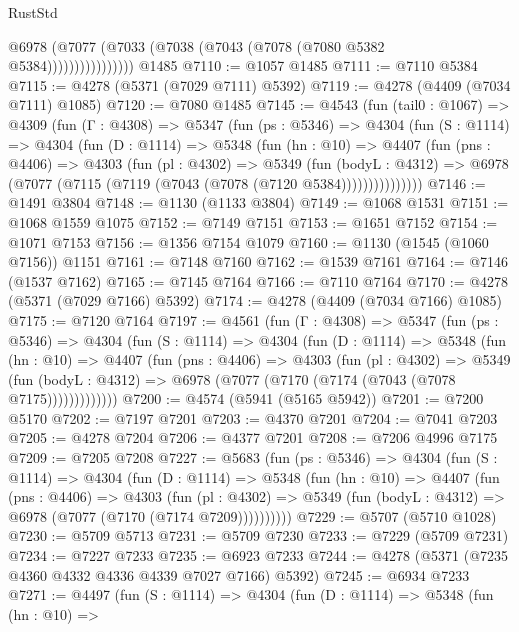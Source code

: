 \begin{lexlean}{RustStd}
\begin{coremodule}
{\begin{coremodule}
{{{{{{{{{{{{{{{{{{{{{{{{{{{{{{{{{{{                      @6978 (@7077 (@7033 (@7038 (@7043 (@7078 (@7080 @5382 @5384))))))))))))))))
    @1485
@7110 := @1057 @1485
@7111 := @7110 @5384
@7115 := @4278 (@5371 (@7029 @7111) @5392)
@7119 := @4278 (@4409 (@7034 @7111) @1085)
@7120 := @7080 @1485
@7145 := @4543
    (fun (tail0 : @1067) =>
    @4309
      (fun (Γ : @4308) =>
      @5347
        (fun (ps : @5346) =>
        @4304
          (fun (S : @1114) =>
          @4304
            (fun (D : @1114) =>
            @5348
              (fun (hn : @10) =>
              @4407
                (fun (pns : @4406) =>
                @4303
                  (fun (pl : @4302) =>
                  @5349
                    (fun (bodyL : @4312) =>
                    @6978 (@7077 (@7115 (@7119 (@7043 (@7078 (@7120 @5384)))))))))))))))
@7146 := @1491 @3804
@7148 := @1130 (@1133 @3804)
@7149 := @1068 @1531
@7151 := @1068 @1559 @1075
@7152 := @7149 @7151
@7153 := @1651 @7152
@7154 := @1071 @7153
@7156 := @1356 @7154 @1079
@7160 := @1130 (@1545 (@1060 @7156)) @1151
@7161 := @7148 @7160
@7162 := @1539 @7161
@7164 := @7146 (@1537 @7162)
@7165 := @7145 @7164
@7166 := @7110 @7164
@7170 := @4278 (@5371 (@7029 @7166) @5392)
@7174 := @4278 (@4409 (@7034 @7166) @1085)
@7175 := @7120 @7164
@7197 := @4561
    (fun (Γ : @4308) =>
    @5347
      (fun (ps : @5346) =>
      @4304
        (fun (S : @1114) =>
        @4304
          (fun (D : @1114) =>
          @5348
            (fun (hn : @10) =>
            @4407
              (fun (pns : @4406) =>
              @4303
                (fun (pl : @4302) =>
                @5349
                  (fun (bodyL : @4312) =>
                  @6978 (@7077 (@7170 (@7174 (@7043 (@7078 @7175)))))))))))))
@7200 := @4574 (@5941 (@5165 @5942))
@7201 := @7200 @5170
@7202 := @7197 @7201
@7203 := @4370 @7201
@7204 := @7041 @7203
@7205 := @4278 @7204
@7206 := @4377 @7201
@7208 := @7206 @4996 @7175
@7209 := @7205 @7208
@7227 := @5683
    (fun (ps : @5346) =>
    @4304
      (fun (S : @1114) =>
      @4304
        (fun (D : @1114) =>
        @5348
          (fun (hn : @10) =>
          @4407
            (fun (pns : @4406) =>
            @4303
              (fun (pl : @4302) =>
              @5349 (fun (bodyL : @4312) => @6978 (@7077 (@7170 (@7174 @7209))))))))))
@7229 := @5707 (@5710 @1028)
@7230 := @5709 @5713
@7231 := @5709 @7230
@7233 := @7229 (@5709 @7231)
@7234 := @7227 @7233
@7235 := @6923 @7233
@7244 := @4278 (@5371 (@7235 @4360 @4332 @4336 @4339 @7027 @7166) @5392)
@7245 := @6934 @7233
@7271 := @4497
    (fun (S : @1114) =>
    @4304
      (fun (D : @1114) =>
      @5348
        (fun (hn : @10) =>
}}}}}}}}}}}}}}}}}}}}}}}}}}}}}}}}}}}
\end{coremodule}}
\end{coremodule}
\end{lexlean}
